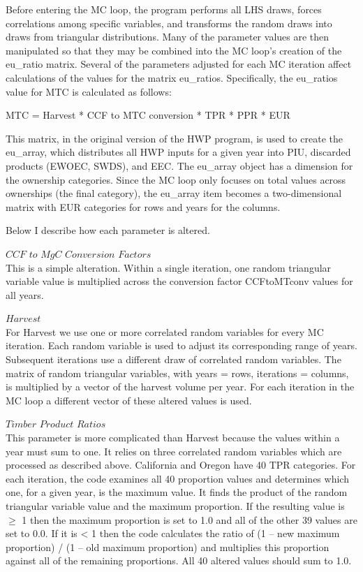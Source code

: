 \documentclass[
  openany]{book}
\begin{document}
Before entering the MC loop, the program performs all LHS draws, forces correlations among specific variables, and transforms the random draws into draws from triangular distributions. Many of the parameter values are then manipulated so that they may be combined into the MC loop's creation of the eu\_ratio matrix. Several of the parameters adjusted for each MC iteration affect calculations of the values for the matrix eu\_ratios. Specifically, the eu\_ratios value for MTC is calculated as follows:

MTC = Harvest * CCF to MTC conversion * TPR * PPR * EUR

This matrix, in the original version of the HWP program, is used to create the eu\_array, which distributes all HWP inputs for a given year into PIU, discarded products (EWOEC, SWDS), and EEC. The eu\_array object has a dimension for the ownership categories. Since the MC loop only focuses on total values across ownerships (the final category), the eu\_array item becomes a two-dimensional matrix with EUR categories for rows and years for the columns.

Below I describe how each parameter is altered.

\(\textit{CCF to MgC Conversion Factors}\)\\
This is a simple alteration. Within a single iteration, one random triangular variable value is multiplied across the conversion factor CCFtoMTconv values for all years.

\(\textit{Harvest}\)\\
For Harvest we use one or more correlated random variables for every MC iteration. Each random variable is used to adjust its corresponding range of years. Subsequent iterations use a different draw of correlated random variables. The matrix of random triangular variables, with years = rows, iterations = columns, is multiplied by a vector of the harvest volume per year. For each iteration in the MC loop a different vector of these altered values is used.

\(\textit{Timber Product Ratios}\)\\
This parameter is more complicated than Harvest because the values within a year must sum to one. It relies on three correlated random variables which are processed as described above. California and Oregon have 40 TPR categories. For each iteration, the code examines all 40 proportion values and determines which one, for a given year, is the maximum value. It finds the product of the random triangular variable value and the maximum proportion. If the resulting value is \(\geq\) 1 then the maximum proportion is set to 1.0 and all of the other 39 values are set to 0.0. If it is \textless{} 1 then the code calculates the ratio of (1 -- new maximum proportion) / (1 -- old maximum proportion) and multiplies this proportion against all of the remaining proportions. All 40 altered values should sum to 1.0.
\end{document}
